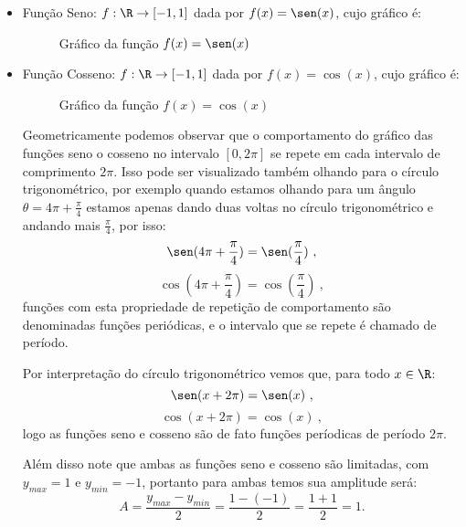   \begin{itemize}
  \item Função Seno: $f: \R \rightarrow [-1, 1]$ dada por $f(x)= \sen (x)$, cujo gráfico é:

  \begin{figure}[H]
  \centering
    \caption{Gráfico da função $f(x)= \sen(x)$}
  \end{figure}

  \item Função Cosseno: $f: \R \rightarrow [-1, 1]$ dada por $f(x)= \cos(x)$, cujo gráfico é:

  \begin{figure}[H]
  \centering
    \caption{Gráfico da função $f(x)= \cos(x)$}
  \end{figure}

  Geometricamente podemos observar que o comportamento do gráfico das funções seno o cosseno no intervalo $[0, 2\pi]$ se repete em cada intervalo de comprimento $2\pi$. Isso pode ser visualizado também olhando para o círculo trigonométrico, por exemplo quando estamos olhando para um ângulo $\theta= 4\pi + \frac{\pi}{4}$ estamos apenas dando duas voltas no círculo trigonométrico e andando mais $\frac{\pi}{4}$, por isso:
\begin{equation}
\sen(4\pi + \frac{\pi}{4})= \sen(\frac{\pi}{4}) \ ,
\end{equation}
\begin{equation}
\cos(4\pi + \frac{\pi}{4})= \cos(\frac{\pi}{4}) \ , 
\end{equation}
  funções com esta propriedade de repetição de comportamento são denominadas funções periódicas, e o intervalo que se repete é chamado de período.

  Por interpretação do círculo trigonométrico vemos que, para todo $x \in \R$:
\begin{equation}
\sen(x + 2 \pi)= \sen(x) \ ,
\end{equation}
\begin{equation}
\cos(x + 2\pi)= \cos(x) \ , 
\end{equation}
  logo as funções seno e cosseno são de fato funções períodicas de período $2\pi$.
  
  Além disso note que ambas as funções seno e cosseno são limitadas, com $y_{max}= 1$ e $y_{min}= -1$, portanto para ambas temos sua amplitude será:
  \begin{equation}
  A= \frac{y_{max} - y_{min}}{2}= \frac{1 - (-1)}{2}= \frac{1+1}{2}= 1.
  \end{equation}
  

\end{itemize}
